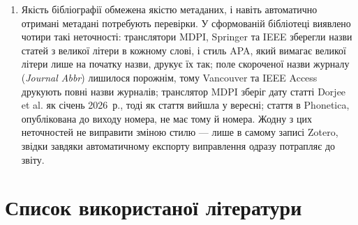 \documentclass[14pt,a4paper]{extreport}
\begin{document}
\begin{enumerate}[ref=\arabic*]
\item Якість бібліографії обмежена якістю метаданих, і навіть автоматично отримані метадані потребують перевірки. У сформованій бібліотеці виявлено чотири такі неточності: транслятори MDPI, Springer та IEEE зберегли назви статей з великої літери в кожному слові, і стиль APA, який вимагає великої літери лише на початку назви, друкує їх так; поле скороченої назви журналу (\textit{Journal Abbr}) лишилося порожнім, тому Vancouver та IEEE Access друкують повні назви журналів; транслятор MDPI зберіг дату статті Dorjee et al. як січень 2026~р., тоді як стаття вийшла у вересні; стаття в Phonetica, опублікована до виходу номера, не має тому й номера. Жодну з цих неточностей не виправити зміною стилю — лише в самому записі Zotero, звідки завдяки автоматичному експорту виправлення одразу потрапляє до звіту.
\end{enumerate}

\section{Список використаної літератури}

\printbibliography[heading=none]
\end{document}
